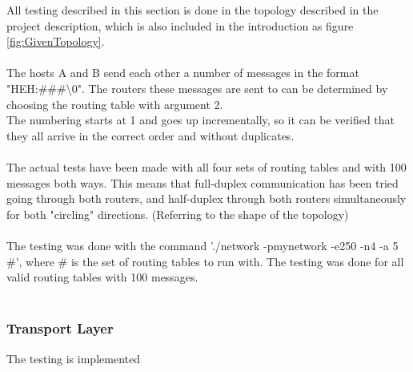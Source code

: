 All testing described in this section is done in the topology described in the project description, which is also included in the introduction as figure \ref{fig:GivenTopology}.
\\
\\
The hosts A and B send each other a number of messages in the format "HEH:\#\#\#\textbackslash0". The routers these messages are sent to can be determined by choosing the routing table with argument 2.\\
The numbering starts at 1 and goes up incrementally, so it can be verified that they all arrive in the correct order and without duplicates.\\
\\
The actual tests have been made with all four sets of routing tables and with 100 messages both ways. This means that full-duplex communication has been tried going through both routers, and half-duplex through both routers simultaneously for both "circling" directions. (Referring to the shape of the topology)\\
\\
The testing was done with the command './network -pmynetwork -e250 -n4 -a 5 \#', where \# is the set of routing tables to run with. The testing was done for all valid routing tables with 100 messages.\\
\\



\subsubsection{Transport Layer}

The testing is implemented

